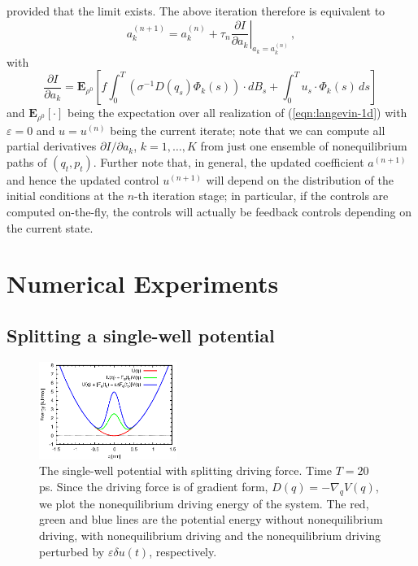 \documentclass[]{tMPH2e}
\newcommand{\eps}{\varepsilon}
\newcommand{\bE}{{\mathbf E}}
\begin{document}
provided that the limit exists. The above iteration therefore is equivalent to
\begin{equation}\label{gd}
a_{k}^{(n+1)} = a_{k}^{(n)} + \tau_{n}\left.\frac{\partial I}{\partial a_{k}}\right|_{a_{k}=a_{k}^{(n)}}\,,
\end{equation}
with
\begin{equation}\label{dida}
\frac{\partial I}{\partial a_{k}} = \bE_{\rho^0}\left[f\int_{0}^{T}(\sigma^{-1}D(q_{s})\Phi_{k}(s))\cdot dB_{s} + \int_{0}^{T}u_{s}\cdot\Phi_{k}(s)\,ds \right] \,
\end{equation}
and $\bE_{\rho^0}[\cdot]$ being the expectation over all realization of (\ref{eqn:langevin-1d}) with $\eps=0$ and $u=u^{(n)}$ being the current iterate; note that we can compute all partial derivatives $\partial I/\partial a_k$, $k=1,\ldots,K$ from just one ensemble of nonequilibrium paths of $(q_{t},p_{t})$. Further note that, in general, the updated coefficient $a^{(n+1)}$ and hence the updated control $u^{(n+1)}$ will depend on the distribution of the initial conditions at the $n$-th iteration stage; in particular, if the controls are computed on-the-fly, the controls will actually be feedback controls depending on the current state.    





\section{Numerical Experiments}

\subsection{Splitting a single-well potential}

\begin{figure}
  \centering
  \includegraphics[width=0.4\textwidth]{figs/fig-split-pot.eps}
  \caption{The single-well potential with  splitting driving
    force. Time $T = 20$ ps.  Since the driving force is
    of gradient form, $ D( q) = -\nabla_{q}V( q)$,
    we plot the nonequilibrium driving energy of the system.  The red,
    green and blue lines are the potential energy without
    nonequilibrium driving, with nonequilibrium driving and
    the nonequilibrium driving perturbed by $\eps\delta u(t)$,
    respectively.  }
  \label{fig:tmp4}
\end{figure}
\end{document}
